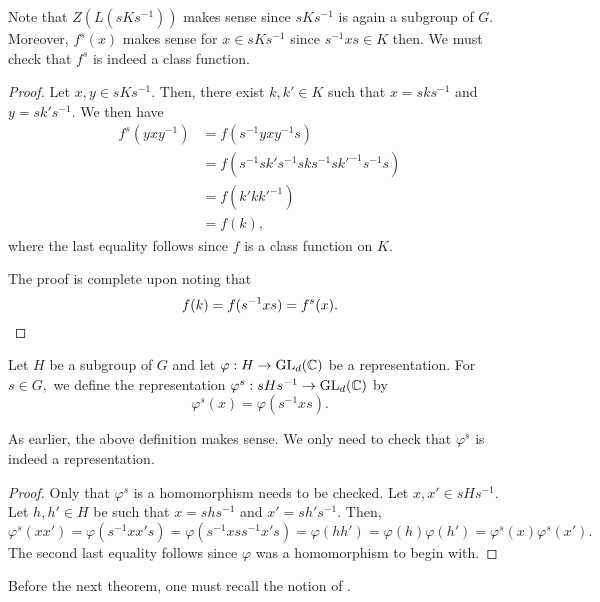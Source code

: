 Note that $Z(L(sKs^{-1}))$ makes sense since $sKs^{-1}$ is again a subgroup of $G.$ Moreover, $f^s(x)$ makes sense for $x \in sKs^{-1}$ since $s^{-1}xs \in K$ then. We must check that $f^s$ is indeed a class function.

\begin{proof} 
	Let $x, y \in sKs^{-1}.$ Then, there exist $k, k' \in K$ such that $x = sks^{-1}$ and $y = sk's^{-1}.$ We then have
	\begin{align*} 
		f^s(yxy^{-1}) &= f(s^{-1}yxy^{-1}s)\\
		&= f(s^{-1}sk's^{-1}sks^{-1}sk'^{-1}s^{-1}s)\\
		&= f(k'kk'^{-1})\\
		&= f(k),
	\end{align*}
	where the last equality follows since $f$ is a class function on $K.$

	The proof is complete upon noting that
	\begin{equation*} 
		f(k) = f(s^{-1}xs) = f^s(x). \qedhere
	\end{equation*}
\end{proof}

\begin{defn}
	Let $H$ be a subgroup of $G$ and let $\varphi : H \to \operatorname{GL}_d(\mathbb{C})$ be a representation. For $s \in G,$ we define the representation $\varphi^s : sHs^{-1} \to \operatorname{GL}_d(\mathbb{C})$ by
	\begin{equation*} 
		\varphi^s(x) = \varphi(s^{-1}xs).
	\end{equation*}
\end{defn}

As earlier, the above definition makes sense. We only need to check that $\varphi^s$ is indeed a representation.

\begin{proof} 
	Only that $\varphi^s$ is a homomorphism needs to be checked. Let $x, x' \in sHs^{-1}.$ Let $h, h' \in H$ be such that $x = shs^{-1}$ and $x' = sh's^{-1}.$ Then,
	\begin{equation*} 
		\varphi^s(xx') = \varphi(s^{-1}xx's) = \varphi(s^{-1}xss^{-1}x's) = \varphi(hh') = \varphi(h)\varphi(h') = \varphi^s(x)\varphi^s(x').
	\end{equation*}
	The second last equality follows since $\varphi$ was a homomorphism to begin with.
\end{proof}

Before the next theorem, one must recall the notion of .


